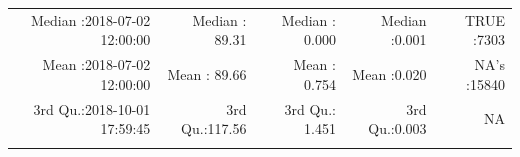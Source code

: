 \documentclass[
  10pt,
  a4paper,oneside]{article}
\begin{document}
\begin{longtable}[]{@{}rrrrr@{}}
\begin{minipage}[t]{0.27\columnwidth}\raggedleft
Median :2018-07-02 12:00:00\strut
\end{minipage} & \begin{minipage}[t]{0.15\columnwidth}\raggedleft
Median : 89.31\strut
\end{minipage} & \begin{minipage}[t]{0.15\columnwidth}\raggedleft
Median : 0.000\strut
\end{minipage} & \begin{minipage}[t]{0.14\columnwidth}\raggedleft
Median :0.001\strut
\end{minipage} & \begin{minipage}[t]{0.14\columnwidth}\raggedleft
TRUE :7303\strut
\end{minipage}\tabularnewline
\begin{minipage}[t]{0.27\columnwidth}\raggedleft
Mean :2018-07-02 12:00:00\strut
\end{minipage} & \begin{minipage}[t]{0.15\columnwidth}\raggedleft
Mean : 89.66\strut
\end{minipage} & \begin{minipage}[t]{0.15\columnwidth}\raggedleft
Mean : 0.754\strut
\end{minipage} & \begin{minipage}[t]{0.14\columnwidth}\raggedleft
Mean :0.020\strut
\end{minipage} & \begin{minipage}[t]{0.14\columnwidth}\raggedleft
NA's :15840\strut
\end{minipage}\tabularnewline
\begin{minipage}[t]{0.27\columnwidth}\raggedleft
3rd Qu.:2018-10-01 17:59:45\strut
\end{minipage} & \begin{minipage}[t]{0.15\columnwidth}\raggedleft
3rd Qu.:117.56\strut
\end{minipage} & \begin{minipage}[t]{0.15\columnwidth}\raggedleft
3rd Qu.: 1.451\strut
\end{minipage} & \begin{minipage}[t]{0.14\columnwidth}\raggedleft
3rd Qu.:0.003\strut
\end{minipage} & \begin{minipage}[t]{0.14\columnwidth}\raggedleft
NA\strut
\end{minipage}\tabularnewline
\begin{minipage}[t]{0.27\columnwidth}\raggedleft

\end{minipage}
\end{longtable}
\end{document}
